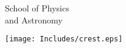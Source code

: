 \makeatletter
\begin{titlepage}
\begin{minipage}[b]{0.8\textwidth}
        {\Huge School of Physics\\ and Astronomy\\}
\end{minipage}
\hfill
\begin{minipage}[t]{40mm}
        \texttt{[image: Includes/crest.eps]}
\end{minipage}
\vspace*{4cm}

{\centering
\ifdefined\@subtitle
{\LARGE\rmfamily\scshape \@subtitle\\}
\fi
{\Huge{} \@title\\}
\vspace{\fill}
{\Large \@author \\[1cm] \LARGE\bfseries \@date\\}
}
\end{titlepage}
\makeatother
